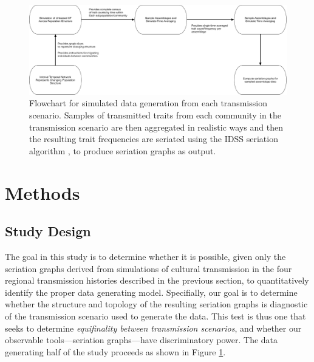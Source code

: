     \begin{figure}[p!]
    \centering
    \includegraphics[scale=0.35,angle=90]{graphics/multipleseriation/simulation-sampling-seriation-flowchart.pdf}
    \caption{Flowchart for simulated data generation from each transmission scenario.  Samples of transmitted traits from each community in the transmission scenario are then aggregated in realistic ways and then the resulting trait frequencies are seriated using the IDSS seriation algorithm \citep{Lipo2015}, to produce seriation graphs as output.}
    \label{metapop:fig:simulation-flowchart}
    \end{figure}
    
    \section{Methods}\label{metapop:sec:methods}
    
    \subsection{Study Design}\label{metapop:sec:study-design}
    
    The goal in this study is to determine whether it is possible, given only the seriation graphs derived from simulations of cultural transmission in the four regional transmission histories described in the previous section, to quantitatively identify the proper data generating model. Specifially, our goal is to determine whether the structure and topology of the resulting seriation graphs is diagnostic of the transmission scenario used to generate the data.  This test is thus one that seeks to determine \emph{equifinality between transmission scenarios}, and whether our observable tools---seriation graphs---have discriminatory power.  The data generating half of the study proceeds as shown in Figure \ref{metapop:fig:simulation-flowchart}.    
    
